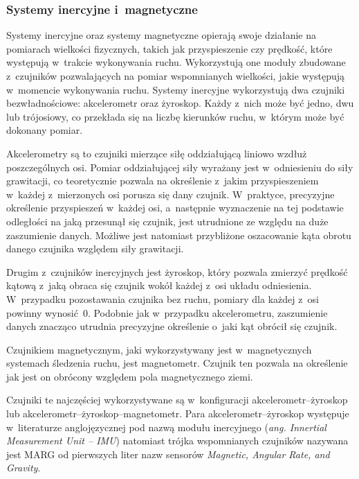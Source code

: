 \subsubsection*{Systemy inercyjne i~magnetyczne}\label{chap:mocaps:IMU}
Systemy inercyjne oraz systemy magnetyczne opierają swoje działanie na pomiarach wielkości fizycznych, takich jak przyspieszenie czy prędkość, które występują w~trakcie wykonywania ruchu. Wykorzystują one moduły zbudowane z~czujników pozwalających na pomiar wspomnianych wielkości, jakie występują w~momencie wykonywania ruchu. Systemy inercyjne wykorzystują dwa czujniki bezwładnościowe: akcelerometr oraz żyroskop. Każdy z~nich może być jedno, dwu lub trójosiowy, co przekłada się na liczbę kierunków ruchu, w~którym może być dokonany pomiar.

Akcelerometry są to czujniki mierzące siłę oddziałującą liniowo wzdłuż poszczególnych osi. Pomiar oddziałującej siły wyrażany jest w~odniesieniu do siły grawitacji, co teoretycznie pozwala na określenie z~jakim przyspieszeniem w~każdej z~mierzonych osi porusza się dany czujnik. W~praktyce, precyzyjne określenie przyspieszeń w~każdej osi, a~następnie wyznaczenie na tej podstawie odległości na jaką przesunął się czujnik, jest utrudnione ze względu na duże zaszumienie danych. Możliwe jest natomiast przybliżone oszacowanie kąta obrotu danego czujnika względem siły grawitacji.

Drugim z~czujników inercyjnych jest żyroskop, który pozwala zmierzyć prędkość kątową z~jaką obraca się czujnik wokół każdej z~osi układu odniesienia. W~przypadku pozostawania czujnika bez ruchu, pomiary dla każdej z~osi powinny wynosić~0. Podobnie jak w~przypadku akcelerometru, zaszumienie danych znacząco utrudnia precyzyjne określenie o~jaki kąt obrócił się czujnik.

Czujnikiem magnetycznym, jaki wykorzystywany jest w~magnetycznych systemach śledzenia ruchu, jest magnetometr. Czujnik ten pozwala na określenie jak jest on obrócony względem pola magnetycznego ziemi.

Czujniki te najczęściej wykorzystywane są w~konfiguracji akcelerometr--żyroskop lub akcelerometr--żyroskop--magnetometr. Para akcelerometr--żyroskop występuje w~literaturze anglojęzycznej pod nazwą modułu inercyjnego (\emph{ang. Innertial Measurement Unit -- IMU}) natomiast trójka wspomnianych czujników nazywana jest MARG od pierwszych liter nazw sensorów \emph{Magnetic, Angular Rate, and Gravity}.

